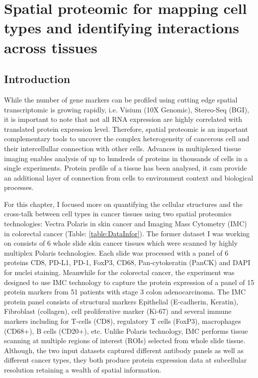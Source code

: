 \chapter[Spatial proteomic for mapping cell types and identifying interactions across tissues]{Spatial proteomic for mapping cell types and identifying interactions across tissues}
\label{Chap:3}	%
\pagestyle{headings}
\section{Introduction}
\label{Sec:3.1_intro}
While the number of gene markers can be profiled using cutting edge spatial transcriptomic is growing rapidly, i.e. Visium (10X Genomic),  Stereo-Seq (BGI), it is important to note that not all RNA expression are highly correlated with translated protein expression level. Therefore, spatial proteomic is an important complementary tools to uncover the complex heterogeneity of cancerous cell and their intercellullar connection with other cells. Advances in multiplexed tissue imaging enables analysis of up to hundreds of proteins in thousands of cells in a single experiments. Protein profile of a tissue has been analysed, it cam provide an additional layer of connection from cells to environment context and biological processes. 

For this chapter, I focused more on quantifying the cellular structures and the cross-talk between cell types in cancer tissues using two spatial proteomics technologies: Vectra Polaris in skin cancer and Imaging Mass Cytometry (IMC) \cite{giesen2014IMC} in colorectal cancer (Table: \ref{table:DataInfor}). The former dataset I was working on  consists of 6 whole slide skin cancer tissues which were scanned by highly multiplex Polaris technologies. Each slide was processed with a panel of 6 proteins CD8, PD-L1, PD-1, FoxP3, CD68, Pan-cytokeratin (PanCK) and DAPI for nuclei staining. Meanwhile for the colorectal cancer, the experiment was designed to use IMC technology to capture the protein expression of a panel of 15 protein markers from 51 patients with stage 3 colon adenocarcinoma. The IMC protein panel consists of structural markers  Epithelial (E-cadherin, Keratin), Fibroblast (collagen), cell proliferative marker (Ki-67) and several immune markers including for T-cells (CD8), regulatory T cells (FoxP3), macrophages (CD68+), B cells (CD20+), etc. Unlike Polaris technology, IMC performs tissue scanning at multiple regions of interest (ROIs) selected from whole slide tissue. Although, the two input datasets captured different antibody panels as well as different cancer types, they both produce protein expression data at subcellular resolution retaining  a wealth of spatial information.    

